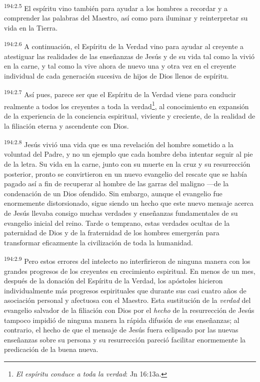 \par
\textsuperscript{194:2.5} El espíritu vino también para ayudar a los hombres a recordar y a comprender las palabras del Maestro, así como para iluminar y reinterpretar su vida en la Tierra.

\par
\textsuperscript{194:2.6} A continuación, el Espíritu de la Verdad vino para ayudar al creyente a atestiguar las realidades de las enseñanzas de Jesús y de su vida tal como la vivió en la carne, y tal como la vive ahora de nuevo una y otra vez en el creyente individual de cada generación sucesiva de hijos de Dios llenos de espíritu.

\par
\textsuperscript{194:2.7} Así pues, parece ser que el Espíritu de la Verdad viene para conducir realmente a todos los creyentes a toda la verdad\footnote{\textit{El espíritu conduce a toda la verdad}: Jn 16:13a.}, al conocimiento en expansión de la experiencia de la conciencia espiritual, viviente y creciente, de la realidad de la filiación eterna y ascendente con Dios.

\par
\textsuperscript{194:2.8} Jesús vivió una vida que es una revelación del hombre sometido a la voluntad del Padre, y no un ejemplo que cada hombre deba intentar seguir al pie de la letra. Su vida en la carne, junto con su muerte en la cruz y su resurrección posterior, pronto se convirtieron en un nuevo evangelio del rescate que se había pagado así a fin de recuperar al hombre de las garras del maligno ---de la condenación de un Dios ofendido. Sin embargo, aunque el evangelio fue enormemente distorsionado, sigue siendo un hecho que este nuevo mensaje acerca de Jesús llevaba consigo muchas verdades y enseñanzas fundamentales de su evangelio inicial del reino. Tarde o temprano, estas verdades ocultas de la paternidad de Dios y de la fraternidad de los hombres emergerán para transformar eficazmente la civilización de toda la humanidad.

\par
\textsuperscript{194:2.9} Pero estos errores del intelecto no interfirieron de ninguna manera con los grandes progresos de los creyentes en crecimiento espiritual. En menos de un mes, después de la donación del Espíritu de la Verdad, los apóstoles hicieron individualmente más progresos espirituales que durante sus casi cuatro años de asociación personal y afectuosa con el Maestro. Esta sustitución de la \textit{verdad} del evangelio salvador de la filiación con Dios por el \textit{hecho} de la resurrección de Jesús tampoco impidió de ninguna manera la rápida difusión de sus enseñanzas; al contrario, el hecho de que el mensaje de Jesús fuera eclipsado por las nuevas enseñanzas sobre su persona y su resurrección pareció facilitar enormemente la predicación de la buena nueva.

